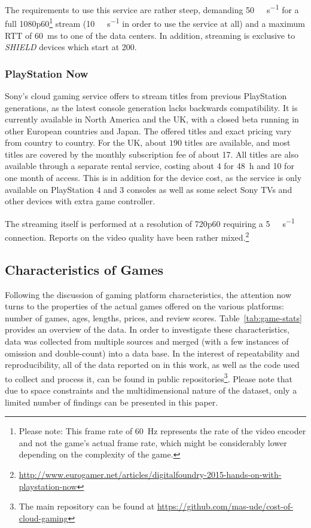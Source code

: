 The requirements to use this service are rather steep, demanding \SI{50}{\mega\bit\per\second} for a full 1080p60\footnote{\label{foot:rate}Please note: This frame rate of \SI{60}{\hertz} represents the rate of the video encoder and not the game's actual frame rate, which might be considerably lower depending on the complexity of the game.} stream (\SI{10}{\mega\bit\per\second} in order to use the service at all) and a maximum \acrshort{RTT} of \SI{60}{\milli\second} to one of the data centers. In addition, streaming is exclusive to \textit{SHIELD} devices which start at \SI{200}[\EUR]{}.

\subsubsection{PlayStation Now}

Sony's cloud gaming service offers to stream titles from previous PlayStation generations, as the latest console generation lacks backwards compatibility. It is currently available in North America and the UK, with a closed beta running in other European countries and Japan. The offered titles and exact pricing vary from country to country. For the UK, about $190$ titles are available, and most titles are covered by the monthly subscription fee of about \SI{17}[\EUR]{}. All titles are also available through a separate rental service, costing about \SI{4}[\EUR]{} for \SI{48}{\hour} and \SI{10}[\EUR]{} for one month of access. This is in addition for the device cost, as the service is only available on PlayStation 4 and 3 consoles as well as some select Sony TVs and other devices with extra game controller.

The streaming itself is performed at a resolution of 720p60 requiring a \SI{5}{\mega\bit\per\second} connection. Reports on the video quality have been rather mixed.\footnote{\url{http://www.eurogamer.net/articles/digitalfoundry-2015-hands-on-with-playstation-now}}



\subsection{Characteristics of Games}

Following the discussion of gaming platform characteristics, the attention now turns to the properties of the actual games offered on the various platforms: number of games, ages, lengths, prices, and review scores. Table~\ref{tab:game-stats} provides an overview of the data.
In order to investigate these characteristics, data was collected from multiple sources and merged (with a few instances of omission and double-count) into a data base. In the interest of repeatability and reproducibility, all of the data reported on in this work, as well as the code used to collect and process it, can be found in public repositories\footnote{The main repository can be found at \url{https://github.com/mas-ude/cost-of-cloud-gaming}}. Please note that due to space constraints and the multidimensional nature of the dataset, only a limited number of findings can be  presented in this paper.

